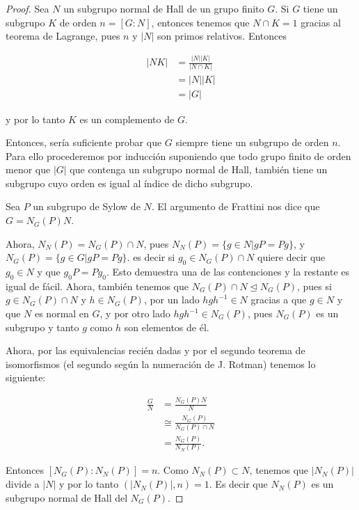 \begin{proof}
    Sea $N$ un subgrupo normal de Hall de un grupo finito $G$. Si $G$ tiene un subgrupo $K$ de orden $n = [G:N]$, entonces
    tenemos que $N \cap K = 1$ gracias al teorema de Lagrange, pues $n$ y $|N|$ son primos relativos. Entonces
    
    \begin{align}
        |NK|    &= \frac{|N||K|}{|N \cap K|}    \\
                &= |N||K|                       \\
                &= |G| 
    \end{align}
    
    y por lo tanto $K$ es un complemento de $G$.\pn
    
    Entonces, sería suficiente probar que $G$ siempre tiene un subgrupo de orden $n$. Para ello procederemos por inducción
    suponiendo que todo grupo finito de orden menor que $|G|$ que contenga un subgrupo normal de Hall, también
    tiene un subgrupo cuyo orden es igual al índice de dicho subgrupo.\pn
    
    Sea $P$ un subgrupo de Sylow de $N$. El argumento de Frattini nos dice que $G = N_G(P)N$.\pn
    
    Ahora, $N_N(P) = N_G(P) \cap N$, pues $N_N(P) = \{ g\in N | gP = Pg \}$, y $N_G(P) = \{ g\in G | gP = Pg \}$. es decir
    si $g_0 \in N_G(P) \cap N$ quiere decir que $g_0 \in N$ y que $g_0P = Pg_0$. Esto demuestra una de las contenciones y la
    restante es igual de fácil. Ahora,  también tenemos que $N_G(P) \cap N \trianglelefteq N_G(P)$, pues si $g \in N_G(P) \cap N$ y
    $h \in N_G(P)$, por un lado $hgh^{-1} \in N$ gracias a que $g \in N$ y que $N$ es normal en $G$, y por otro lado 
    $hgh^{-1} \in N_G(P)$, pues $N_G(P)$ es un subgrupo y tanto $g$ como $h$ son elementos de él.\pn
    
    Ahora, por las equivalencias recién dadas y por el segundo teorema de isomorfismos 
    (el segundo según la numeración de J. Rotman) tenemos lo siguiente:
    
    \begin{align}
            \frac{G}{N}     &=      \frac{N_G(P)N}{N}               \\
                            &\cong  \frac{N_G(P)}{N_G(P) \cap N}    \\
                            &=      \frac{N_G(P)}{N_N(P)}.
    \end{align}\pn
    
    Entonces $[N_G(P) : N_N(P)] = n$. Como $N_N(P) \subset N$, tenemos que $|N_N(P)|$ divide a $|N|$ y por lo tanto
    $(|N_N(P)|, n) = 1$. Es decir que $N_N(P)$ es un subgrupo normal de Hall del $N_G(P)$.\pn
    

\end{proof}
